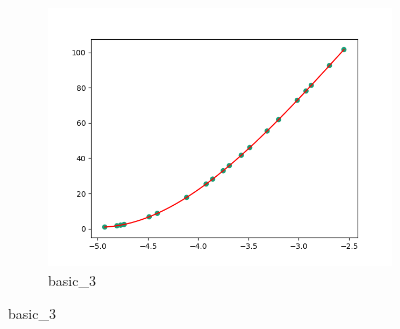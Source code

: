 \documentclass[notitlepage, 11pt]{report}
\begin{document}
\begin{figure}[H]
\begin{subfigure}{0.25\textwidth}
				\end{subfigure}\hfil %
				\begin{subfigure}{0.25\textwidth}
					\includegraphics[width=\linewidth]{Figure_3}
					\caption{basic\_3}
					\label{fig:3}
				\end{subfigure}
				

\end{figure}
\end{document}
